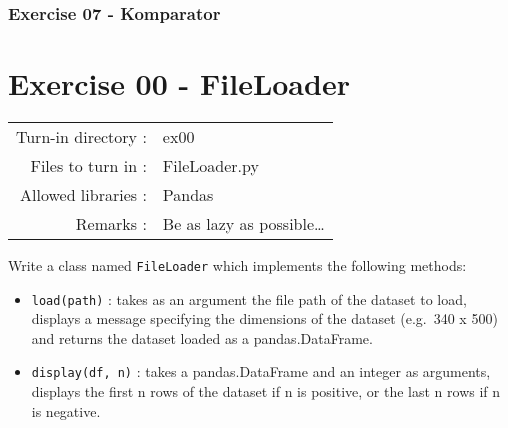 \documentclass[]{article}
\begin{document}
\hypertarget{exercise-07---komparator}{%
\subsubsection{Exercise 07 -
Komparator}\label{exercise-07---komparator}}

\clearpage

\hypertarget{exercise-00---fileloader-1}{%
\section{Exercise 00 - FileLoader}\label{exercise-00---fileloader-1}}

\begin{longtable}[]{@{}rl@{}}
\toprule
\endhead
Turn-in directory : & ex00\tabularnewline
Files to turn in : & FileLoader.py\tabularnewline
Allowed libraries : & Pandas\tabularnewline
Remarks : & Be as lazy as possible\ldots{}\tabularnewline
\bottomrule
\end{longtable}

Write a class named \texttt{FileLoader} which implements the following
methods:

\begin{itemize}
\item
  \texttt{load(path)} : takes as an argument the file path of the
  dataset to load, displays a message specifying the dimensions of the
  dataset (e.g.~340 x 500) and returns the dataset loaded as a
  pandas.DataFrame.
\item
  \texttt{display(df,\ n)} : takes a pandas.DataFrame and an integer as
  arguments, displays the first n rows of the dataset if n is positive,
  or the last n rows if n is negative.
\end{itemize}
\end{document}

